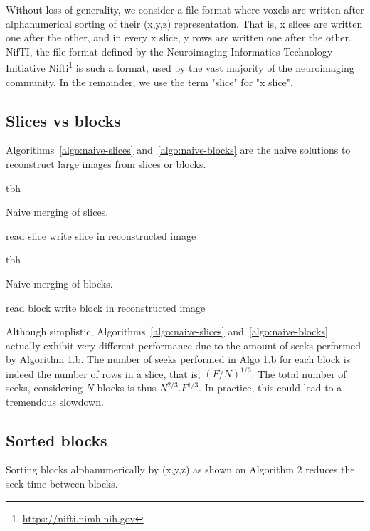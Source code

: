 \documentclass[10pt, conference, compsocconf]{IEEEtran}
\begin{document}
Without loss of generality, we consider a file format where voxels are
written after alphanumerical sorting of their (x,y,z)
representation. That is, x slices are written one after the other, and
in every x slice, y rows are written one after the other. NifTI, the
file format defined by the Neuroimaging Informatics Technology
Initiative Nifti\footnote{\url{https://nifti.nimh.nih.gov}} is such a
format, used by the vast majority of the neuroimaging community. In
the remainder, we use the term "slice" for "x slice".


\subsection{Slices vs blocks}

Algorithms~\ref{algo:naive-slices} and~\ref{algo:naive-blocks} are the
naive solutions to reconstruct large images from slices or blocks.
\begin{algorithm}{tbh}
\caption{Naive merging of slices.}
\label{algo:naive-slices} 
\begin{algorithmic}
    \STATE read slice
    \STATE write slice in reconstructed image
  \ENDFOR      
\end{algorithmic}
\end{algorithm}

\begin{algorithm}{tbh}
\caption{Naive merging of blocks.}
\label{algo:naive-blocks}
\begin{algorithmic}
    \STATE read block
    \STATE write block in reconstructed image
  \ENDFOR 
\end{algorithmic}
\end{algorithm}

Although simplistic, Algorithms~\ref{algo:naive-slices}
and~\ref{algo:naive-blocks} actually exhibit very different
performance due to the amount of seeks performed by Algorithm 1.b. The
number of seeks performed in Algo 1.b for each block is indeed the
number of rows in a slice, that is, $(F/N)^{1/3}$. The total number of
seeks, considering $N$ blocks is thus $N^{2/3}.F^{1/3}$. In practice,
this could lead to a tremendous slowdown.

\subsection{Sorted blocks}

Sorting blocks alphanumerically by (x,y,z) as shown on Algorithm 2 reduces the seek time
between blocks.
\end{document}
